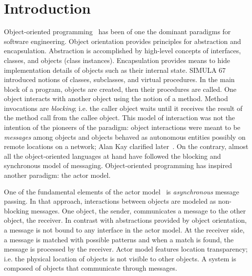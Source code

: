
\chapter[Introduction]{Introduction}
\label{ch:intro}
\label{sec:intro:abs}


Object-oriented programming~\cite{booch1982object,meyer1988object} has been of one the dominant paradigms for software engineering.
Object orientation provides principles for abstraction and encapsulation.
Abstraction is accomplished by high-level concepts of interfaces, classes, and objects (class instances).
Encapsulation provides means to hide implementation details of objects such as their internal state.
SIMULA 67~\cite{Dahl:1968:simula} introduced notions of classes, subclasses, and virtual procedures.
In the main block of a program, objects are created, then their procedures are called.
One object interacts with another object using the notion of a method.
Method invocations are \emph{blocking}; i.e. the caller object waits until it receives the result of the method call from the callee object.
This model of interaction was not the intention of the pioneers of the paradigm:
object interactions were meant to be \emph{messages} among objects and objects behaved as autonomous entities possibly on remote locations on a network; Alan Kay clarified later~\cite{alank1,alank2}. 
On the contrary, almost all the object-oriented languages at hand have followed the blocking and synchronous model of messaging. 
Object-oriented programming has inspired another paradigm: the actor model.

One of the fundamental elements of the actor model~\cite{actors:agha,agha97} is \emph{asynchronous} message passing.
In that approach, interactions between objects are modeled as non-blocking messages.
One object, the sender, communicates a message to the other object, the receiver.
In contrast with abstractions provided by object orientation, a message is not bound to any interface in the actor model.
At the receiver side, a message is matched with possible patterns and when a match is found, the message is processed by the receiver. 
Actor model features location transparency; i.e. the physical location of objects is not visible to other objects.
A system is composed of objects that communicate through messages.

